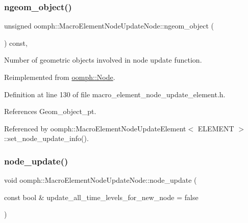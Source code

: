 \subsubsection{\texorpdfstring{ngeom\+\_\+object()}{ngeom\_object()}}
{\footnotesize\ttfamily unsigned oomph\+::\+Macro\+Element\+Node\+Update\+Node\+::ngeom\+\_\+object (\begin{DoxyParamCaption}{ }\end{DoxyParamCaption}) const\hspace{0.3cm}{\ttfamily [inline]}, {\ttfamily [virtual]}}



Number of geometric objects involved in node update function. 



Reimplemented from \hyperlink{classoomph_1_1Node_a2c0fb79493f94d2ce19736737ebf5447}{oomph\+::\+Node}.



Definition at line 130 of file macro\+\_\+element\+\_\+node\+\_\+update\+\_\+element.\+h.



References Geom\+\_\+object\+\_\+pt.



Referenced by oomph\+::\+Macro\+Element\+Node\+Update\+Element$<$ E\+L\+E\+M\+E\+N\+T $>$\+::set\+\_\+node\+\_\+update\+\_\+info().

\mbox{\label{classoomph_1_1MacroElementNodeUpdateNode_a02adaf04277672fd0e1be5296e6ed6cf}} 
\subsubsection{\texorpdfstring{node\+\_\+update()}{node\_update()}}
{\footnotesize\ttfamily void oomph\+::\+Macro\+Element\+Node\+Update\+Node\+::node\+\_\+update (\begin{DoxyParamCaption}\item[{const bool \&}]{update\+\_\+all\+\_\+time\+\_\+levels\+\_\+for\+\_\+new\+\_\+node = {\ttfamily false} }\end{DoxyParamCaption})\hspace{0.3cm}{\ttfamily [virtual]}}



